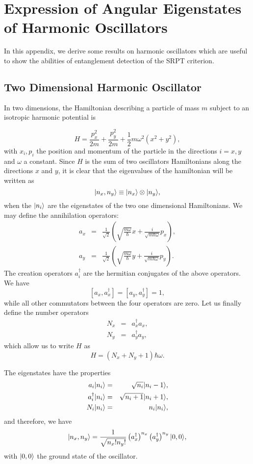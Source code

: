 

\chapter{Expression of Angular Eigenstates of Harmonic Oscillators} \label{appA}

In this appendix, we derive some results on harmonic oscillators which are useful to show the abilities of entanglement detection of the SRPT criterion.

\section{Two Dimensional Harmonic Oscillator}

In two dimensions, the Hamiltonian describing a particle of mass $m$ subject to an isotropic harmonic potential is

\[ H =  \frac{p_x^2}{2m}+\frac{p_y^2}{2m} + \frac 1 2 m \omega^2 \left( x^2 + y^2 \right),\]
with $x_i, p_i$ the position and momentum of the particle in the directions $i=x,y$ and $\omega$ a constant. Since $H$ is the sum of two  oscillators Hamiltonians along the directions $x$ and $y$, it is clear that the eigenvalues of the hamiltonian will be written as
\[ | n_x, n_y \rangle \equiv | n_x \rangle \otimes | n_y \rangle, \]
when the $| n_i \rangle$ are the eigenstates of the two one dimensional Hamiltonians. We may define the annihilation operators:
\begin{eqnarray}
    a_x &=& \frac{1}{\sqrt 2} \left( \sqrt{\frac{m\omega}{\hbar}} x + \frac{i}{\sqrt{m \hbar \omega}} p_x \right), \\
    a_y &=& \frac{1}{\sqrt 2} \left( \sqrt{\frac{m\omega}{\hbar}} y +\frac{i}{\sqrt{m \hbar \omega}} p_y \right).
\end{eqnarray}
The creation operators $a^\dagger_i$ are the hermitian conjugates of the above operators. We have
\[ [a_x,a^\dagger_x]= [a_y,a^\dagger_y]=1, \]
while all other commutators between the four operators are zero. Let us finally define the number operators
\begin{eqnarray}
    N_x &=&a_x^\dagger a_x, \\
    N_y &=& a_y^\dagger a_y,
\end{eqnarray}
which allow us to write $H$ as
\[ H = (N_x + N_y +1) \hbar \omega. \]

The eigenstates have the properties
\begin{eqnarray}
    a_i | n_i \rangle &=& \sqrt{n_i} | n_i-1 \rangle,\\
    a_i^\dagger | n_i \rangle &=& \sqrt{n_i+1} | n_i+1 \rangle,\\
    N_i | n_i \rangle &=& n_i | n_i \rangle,
\end{eqnarray}
and therefore, we have
\[  | n_x,n_y \rangle = \frac{1}{\sqrt{n_x! n_y!}} \left( a_x^\dagger \right)^{n_x}  \left( a_y^\dagger \right)^{n_y} | 0,0 \rangle, \]
with $| 0,0 \rangle$ the ground state of the oscillator.

